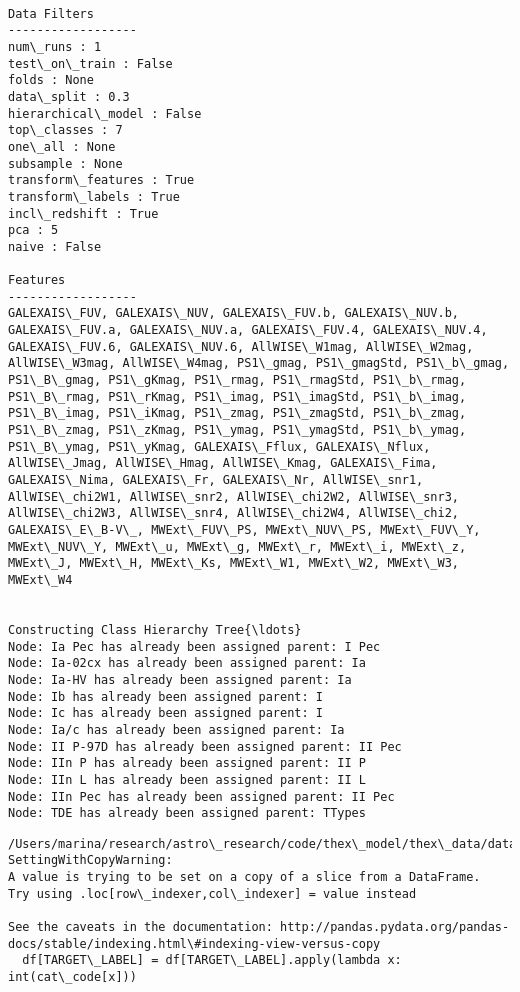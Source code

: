\documentclass[11pt]{article}
\begin{document}
    \begin{Verbatim}[commandchars=\\\{\}]

Data Filters
------------------
num\_runs : 1
test\_on\_train : False
folds : None
data\_split : 0.3
hierarchical\_model : False
top\_classes : 7
one\_all : None
subsample : None
transform\_features : True
transform\_labels : True
incl\_redshift : True
pca : 5
naive : False

Features
------------------
GALEXAIS\_FUV, GALEXAIS\_NUV, GALEXAIS\_FUV.b, GALEXAIS\_NUV.b, GALEXAIS\_FUV.a, GALEXAIS\_NUV.a, GALEXAIS\_FUV.4, GALEXAIS\_NUV.4, GALEXAIS\_FUV.6, GALEXAIS\_NUV.6, AllWISE\_W1mag, AllWISE\_W2mag, AllWISE\_W3mag, AllWISE\_W4mag, PS1\_gmag, PS1\_gmagStd, PS1\_b\_gmag, PS1\_B\_gmag, PS1\_gKmag, PS1\_rmag, PS1\_rmagStd, PS1\_b\_rmag, PS1\_B\_rmag, PS1\_rKmag, PS1\_imag, PS1\_imagStd, PS1\_b\_imag, PS1\_B\_imag, PS1\_iKmag, PS1\_zmag, PS1\_zmagStd, PS1\_b\_zmag, PS1\_B\_zmag, PS1\_zKmag, PS1\_ymag, PS1\_ymagStd, PS1\_b\_ymag, PS1\_B\_ymag, PS1\_yKmag, GALEXAIS\_Fflux, GALEXAIS\_Nflux, AllWISE\_Jmag, AllWISE\_Hmag, AllWISE\_Kmag, GALEXAIS\_Fima, GALEXAIS\_Nima, GALEXAIS\_Fr, GALEXAIS\_Nr, AllWISE\_snr1, AllWISE\_chi2W1, AllWISE\_snr2, AllWISE\_chi2W2, AllWISE\_snr3, AllWISE\_chi2W3, AllWISE\_snr4, AllWISE\_chi2W4, AllWISE\_chi2, GALEXAIS\_E\_B-V\_, MWExt\_FUV\_PS, MWExt\_NUV\_PS, MWExt\_FUV\_Y, MWExt\_NUV\_Y, MWExt\_u, MWExt\_g, MWExt\_r, MWExt\_i, MWExt\_z, MWExt\_J, MWExt\_H, MWExt\_Ks, MWExt\_W1, MWExt\_W2, MWExt\_W3, MWExt\_W4


Constructing Class Hierarchy Tree{\ldots}
Node: Ia Pec has already been assigned parent: I Pec
Node: Ia-02cx has already been assigned parent: Ia
Node: Ia-HV has already been assigned parent: Ia
Node: Ib has already been assigned parent: I
Node: Ic has already been assigned parent: I
Node: Ia/c has already been assigned parent: Ia
Node: II P-97D has already been assigned parent: II Pec
Node: IIn P has already been assigned parent: II P
Node: IIn L has already been assigned parent: II L
Node: IIn Pec has already been assigned parent: II Pec
Node: TDE has already been assigned parent: TTypes

    \end{Verbatim}

    \begin{Verbatim}[commandchars=\\\{\}]
/Users/marina/research/astro\_research/code/thex\_model/thex\_data/data\_clean.py:70: SettingWithCopyWarning: 
A value is trying to be set on a copy of a slice from a DataFrame.
Try using .loc[row\_indexer,col\_indexer] = value instead

See the caveats in the documentation: http://pandas.pydata.org/pandas-docs/stable/indexing.html\#indexing-view-versus-copy
  df[TARGET\_LABEL] = df[TARGET\_LABEL].apply(lambda x: int(cat\_code[x]))

    \end{Verbatim}
\end{document}
